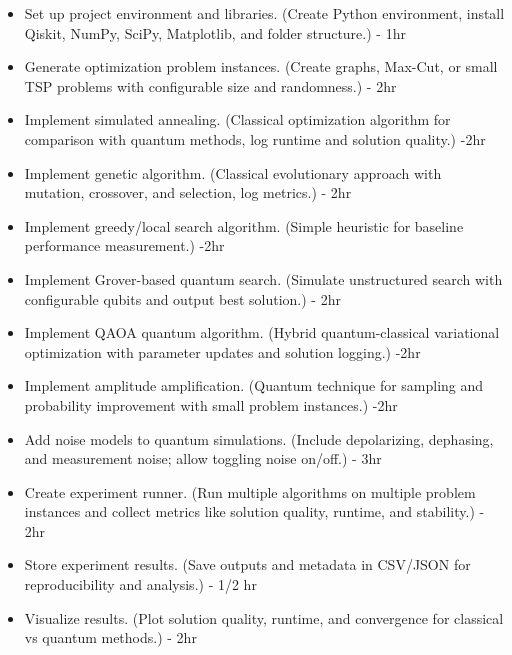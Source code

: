 \documentclass[12pt]{article}
\begin{document}
\begin{itemize}
\item Set up project environment and libraries. (Create Python environment, install Qiskit, NumPy, SciPy, Matplotlib, and folder structure.) - 1hr
    \item Generate optimization problem instances. (Create graphs, Max-Cut, or small TSP problems with configurable size and randomness.) - 2hr
    \item Implement simulated annealing. (Classical optimization algorithm for comparison with quantum methods, log runtime and solution quality.) -2hr
    \item Implement genetic algorithm. (Classical evolutionary approach with mutation, crossover, and selection, log metrics.) - 2hr
    \item Implement greedy/local search algorithm. (Simple heuristic for baseline performance measurement.) -2hr
    \item Implement Grover-based quantum search. (Simulate unstructured search with configurable qubits and output best solution.) - 2hr
    \item Implement QAOA quantum algorithm. (Hybrid quantum-classical variational optimization with parameter updates and solution logging.) -2hr
    \item Implement amplitude amplification. (Quantum technique for sampling and probability improvement with small problem instances.) -2hr
    \item Add noise models to quantum simulations. (Include depolarizing, dephasing, and measurement noise; allow toggling noise on/off.) - 3hr
    \item Create experiment runner. (Run multiple algorithms on multiple problem instances and collect metrics like solution quality, runtime, and stability.) - 2hr
    \item Store experiment results. (Save outputs and metadata in CSV/JSON for reproducibility and analysis.) - 1/2 hr
    \item Visualize results. (Plot solution quality, runtime, and convergence for classical vs quantum methods.) - 2hr
\end{itemize}




\end{document}
